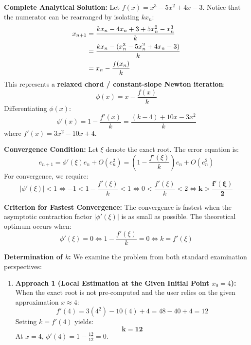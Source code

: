 \documentclass[11pt,a4paper]{article}
\numberwithin{equation}{section}
\begin{document}
\begin{solbox}
\textbf{Complete Analytical Solution:}
Let $f(x) = x^3 - 5x^2 + 4x - 3$. Notice that the numerator can be rearranged by isolating $k x_n$:
\begin{align}
    x_{n+1} &= \frac{k x_n - 4x_n + 3 + 5x_n^2 - x_n^3}{k} \notag \\
    &= \frac{k x_n - (x_n^3 - 5x_n^2 + 4x_n - 3)}{k} \notag \\
    &= x_n - \frac{f(x_n)}{k}
\end{align}
This represents a \textbf{relaxed chord / constant-slope Newton iteration}:
\begin{equation}
    \phi(x) = x - \frac{f(x)}{k}
\end{equation}
Differentiating $\phi(x)$:
\begin{equation}
    \phi'(x) = 1 - \frac{f'(x)}{k} = \frac{(k - 4) + 10x - 3x^2}{k}
\end{equation}
where $f'(x) = 3x^2 - 10x + 4$.

\vspace{0.2cm}
\noindent\textbf{Convergence Condition:}
Let $\xi$ denote the exact root. The error equation is:
\begin{equation}
    e_{n+1} = \phi'(\xi) e_n + O(e_n^2) = \left( 1 - \frac{f'(\xi)}{k} \right) e_n + O(e_n^2)
\end{equation}
For convergence, we require:
\begin{equation}
    |\phi'(\xi)| < 1 \iff -1 < 1 - \frac{f'(\xi)}{k} < 1 \iff 0 < \frac{f'(\xi)}{k} < 2 \iff \mathbf{k > \frac{f'(\xi)}{2}}
\end{equation}

\noindent\textbf{Criterion for Fastest Convergence:}
The convergence is fastest when the asymptotic contraction factor $|\phi'(\xi)|$ is as small as possible. The theoretical optimum occurs when:
\begin{equation}
    \phi'(\xi) = 0 \iff 1 - \frac{f'(\xi)}{k} = 0 \iff k = f'(\xi)
\end{equation}

\noindent\textbf{Determination of $k$:}
We examine the problem from both standard examination perspectives:
\begin{enumerate}[leftmargin=2em]
    \item \textbf{Approach 1 (Local Estimation at the Given Initial Point $x_0 = 4$):} \\
    When the exact root is not pre-computed and the user relies on the given approximation $x \approx 4$:
    \begin{equation}
        f'(4) = 3(4^2) - 10(4) + 4 = 48 - 40 + 4 = 12
    \end{equation}
    Setting $k = f'(4)$ yields:
    \begin{equation}
        \mathbf{k = 12}
    \end{equation}
    At $x = 4$, $\phi'(4) = 1 - \frac{12}{12} = 0$.
    

\end{enumerate}
\end{solbox}
\end{document}
